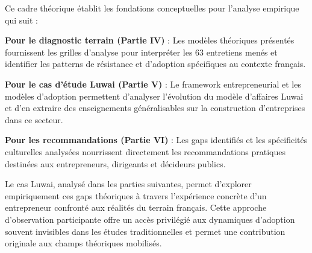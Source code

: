Ce cadre théorique établit les fondations conceptuelles pour l'analyse empirique qui suit :

\textbf{Pour le diagnostic terrain (Partie IV)} : Les modèles théoriques présentés fournissent les grilles d'analyse pour interpréter les 63 entretiens menés et identifier les patterns de résistance et d'adoption spécifiques au contexte français.

\textbf{Pour le cas d'étude Luwai (Partie V)} : Le framework entrepreneurial et les modèles d'adoption permettent d'analyser l'évolution du modèle d'affaires Luwai et d'en extraire des enseignements généralisables sur la construction d'entreprises dans ce secteur.

\textbf{Pour les recommandations (Partie VI)} : Les gaps identifiés et les spécificités culturelles analysées nourrissent directement les recommandations pratiques destinées aux entrepreneurs, dirigeants et décideurs publics.

Le cas Luwai, analysé dans les parties suivantes, permet d'explorer empiriquement ces gaps théoriques à travers l'expérience concrète d'un entrepreneur confronté aux réalités du terrain français. Cette approche d'observation participante offre un accès privilégié aux dynamiques d'adoption souvent invisibles dans les études traditionnelles et permet une contribution originale aux champs théoriques mobilisés.